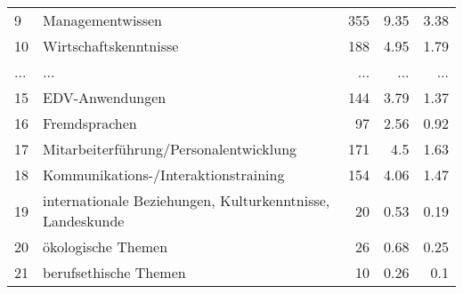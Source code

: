 \begin{longtable}{lXrrr}
        9 & \multicolumn{1}{X}{Managementwissen} & %
          \num{355} &
          \num[round-mode=places,round-precision=2]{9.35} &
          \num[round-mode=places,round-precision=2]{3.38} \\
        10 & \multicolumn{1}{X}{Wirtschaftskenntnisse} & %
          \num{188} &
          \num[round-mode=places,round-precision=2]{4.95} &
          \num[round-mode=places,round-precision=2]{1.79} \\
       ... & ... & ... & ... & ... \\
        15 & \multicolumn{1}{X}{EDV-Anwendungen} & %
          \num{144} &
          \num[round-mode=places,round-precision=2]{3.79} &
          \num[round-mode=places,round-precision=2]{1.37} \\

        16 & \multicolumn{1}{X}{Fremdsprachen} & %
          \num{97} &
          \num[round-mode=places,round-precision=2]{2.56} &
          \num[round-mode=places,round-precision=2]{0.92} \\

        17 & \multicolumn{1}{X}{Mitarbeiterführung/Personalentwicklung} & %
          \num{171} &
          \num[round-mode=places,round-precision=2]{4.5} &
          \num[round-mode=places,round-precision=2]{1.63} \\

        18 & \multicolumn{1}{X}{Kommunikations-/Interaktionstraining} & %
          \num{154} &
          \num[round-mode=places,round-precision=2]{4.06} &
          \num[round-mode=places,round-precision=2]{1.47} \\

        19 & \multicolumn{1}{X}{internationale Beziehungen, Kulturkenntnisse, Landeskunde} & %
          \num{20} &
          \num[round-mode=places,round-precision=2]{0.53} &
          \num[round-mode=places,round-precision=2]{0.19} \\

        20 & \multicolumn{1}{X}{ökologische Themen} & %
          \num{26} &
          \num[round-mode=places,round-precision=2]{0.68} &
          \num[round-mode=places,round-precision=2]{0.25} \\

        21 & \multicolumn{1}{X}{berufsethische Themen} & %
          \num{10} &
          \num[round-mode=places,round-precision=2]{0.26} &
          \num[round-mode=places,round-precision=2]{0.1} \\


\end{longtable}
